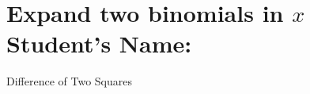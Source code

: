 \documentclass[12pt, a4paper, addpoints]{exam}
\newcommand{\hs}{\vspace{30mm}}
\newcommand{\perfectsquare}{%
    \pgfmathtruncatemacro{\a}{random(1,5)} %
    \pgfmathtruncatemacro{\b}{random(1,5)} %
    \edef\result{(\a x + \b)(\a x + \b)}%
    \result
}
\newcommand{\differenceofsquares}{%
    \pgfmathtruncatemacro{\a}{random(1,5)} %
    \pgfmathtruncatemacro{\b}{random(1,5)} %
    \edef\result{(\a x + \b)(\a x - \b)}%
    \result
}
\newcommand{\trivialperfectsquare}{%
    \pgfmathtruncatemacro{\b}{random(1,5)} %
    \edef\result{(x + \b)(x + \b)}%
    \result
}
\begin{document}
\section*{Expand two binomials in \( x \) \quad  Student's Name: \underline{\hspace{5cm}}}

\begin{questions}
\LARGE

\question
\setlength{\columnsep}{20pt}
\begin{multicols}{2}
\begin{parts}
    \part \( \perfectsquare \)  \hs
    \part \( \perfectsquare \)  \hs
\end{parts}
\end{multicols}
\hs
\question Difference of Two Squares
\setlength{\columnsep}{20pt}
\begin{multicols}{2}
\begin{parts} 
    \part \( \differenceofsquares \)  \hs
    \part \( \differenceofsquares \)  \hs
\end{parts}
\end{multicols}

\hs
\question
\setlength{\columnsep}{20pt}
\begin{multicols}{2}
\begin{parts}
    \part \( \trivialperfectsquare \)  \hs
    \part \( \trivialperfectsquare \)  \hs
\end{parts}
\end{multicols}

\question
\setlength{\columnsep}{20pt}
\begin{multicols}{2}
\begin{parts}
    \part \( \generalform \)  \hs
    \part \( \generalform \)  \hs
\end{parts}
\end{multicols}

\end{questions}
\end{document}
